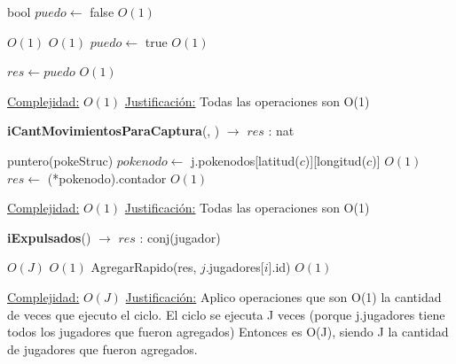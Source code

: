 \begin{Algoritmos}
\begin{algorithm}[H]
\begin{algorithmic}[1]
\State bool $puedo \gets$ false  \Comment $O(1)$

   \Comment $O(1)$
       \Comment $O(1)$
        \State $puedo \gets$ true        \Comment $O(1)$
    \EndIf
\EndIf

\State $res \gets puedo$  \Comment $O(1)$

\medskip
\State \underline{Complejidad:} $O(1)$
\State \underline{Justificaci\'on:} Todas las operaciones son O(1)

\end{algorithmic}
\end{algorithm}



\begin{algorithm}[H]
{\textbf{iCantMovimientosParaCaptura}(, ) $\to$ $res$ :    nat}
\begin{algorithmic}[1]

\State puntero(pokeStruc) $pokenodo \gets$ j.pokenodos[latitud($c$)][longitud($c$)] \Comment $O(1)$
\State $res \gets$ (*pokenodo).contador  \Comment $O(1)$

\medskip
\State \underline{Complejidad:} $O(1)$
\State \underline{Justificaci\'on:} Todas las operaciones son O(1)

\end{algorithmic}
\end{algorithm}



\begin{algorithm}[H]
{\textbf{iExpulsados}() $\to$ $res$ : conj(jugador)}
\begin{algorithmic}[1]

   \Comment $O(J)$
       \Comment $O(1)$
        \State AgregarRapido(res, $j$.jugadores[$i$].id)  \Comment $O(1)$        
    \EndIf
\EndFor

\medskip
\State \underline{Complejidad:} $O(J)$
\State \underline{Justificaci\'on:} Aplico operaciones que son O(1) la cantidad de veces que ejecuto el ciclo. El ciclo se ejecuta J veces (porque j.jugadores tiene todos los jugadores que fueron agregados) Entonces es O(J), siendo J la cantidad de jugadores que fueron agregados.

\end{algorithmic}
\end{algorithm}



\end{Algoritmos}
